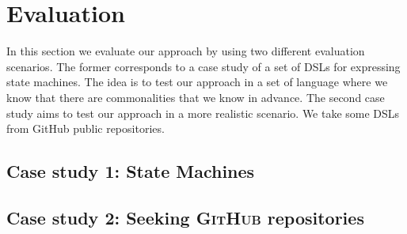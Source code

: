 \section{Evaluation}
\label{sec:validation}

In this section we evaluate our approach by using two different evaluation scenarios. The former corresponds to a case study of a set of DSLs for expressing state machines. The idea is to test our approach in a set of language where we know that there are commonalities that we know in advance. The second case study aims to test our approach in a more realistic scenario. We take some DSLs from GitHub public repositories. 

\subsection{Case study 1: State Machines}

\subsection{Case study 2: Seeking \textsc{GitHub} repositories} 
